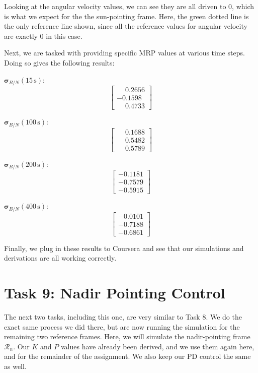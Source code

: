 \documentclass[conf]{new-aiaa}
\begin{document}
Looking at the angular velocity values, we can see they are all driven to 0, which is what we expect for the the sun-pointing frame. Here, the green dotted line is the only reference line shown, since all the reference values for angular velocity are exactly 0 in this case.

Next, we are tasked with providing specific MRP values at various time steps. Doing so gives the following results:

$\bm{\sigma}_{B/N}(15\,\text{s})$:
\[
\begin{bmatrix}
\phantom{-}0.2656 \\
-0.1598 \\
\phantom{-}0.4733
\end{bmatrix}
\]

$\bm{\sigma}_{B/N}(100\,\text{s})$:
\[
\begin{bmatrix}
\phantom{-}0.1688 \\
\phantom{-}0.5482 \\
\phantom{-}0.5789
\end{bmatrix}
\]

$\bm{\sigma}_{B/N}(200\,\text{s})$:
\[
\begin{bmatrix}
-0.1181 \\
-0.7579 \\
-0.5915
\end{bmatrix}
\]

$\bm{\sigma}_{B/N}(400\,\text{s})$:
\[
\begin{bmatrix}
-0.0101 \\
-0.7188 \\
-0.6861
\end{bmatrix}
\]

\vspace{1em}
Finally, we plug in these results to Coursera and see that our simulations and derivations are all working correctly.







\section{Task 9: Nadir Pointing Control}
The next two tasks, including this one, are very similar to Task 8. We do the exact same process we did there, but are now running the simulation for the remaining two reference frames. Here, we will simulate the nadir-pointing frame $\mathcal{R}_n$. Our $K$ and $P$ values have already been derived, and we use them again here, and for the remainder of the assignment. We also keep our PD control the same as well. 
\end{document}

